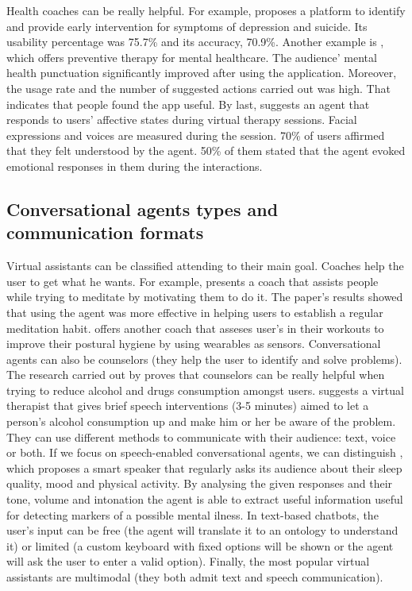 \documentclass[12pt,english]{article}
\begin{document}
Health coaches can be really helpful. For example, \cite{Breso2016297} proposes a platform to identify and provide early intervention for symptoms of depression and suicide. Its usability percentage was 75.7\% and its accuracy, 70.9\%. Another example is \cite{Hirano2017}, which offers preventive therapy for mental healthcare. The audience' mental health punctuation significantly improved after using the application. Moreover, the usage rate and the number of suggested actions carried out was high. That indicates that people found the app useful. By last, \cite{Ring2016} suggests an agent that responds to users' affective states during virtual therapy sessions. Facial expressions and voices are measured during the session. 70\% of users affirmed that they felt understood by the agent. 50\% of them stated that the agent evoked emotional responses in them during the interactions.

\newpage
\subsection{Conversational agents types and communication formats}

Virtual assistants can be classified attending to their main goal. Coaches help the user to get what he wants. For example, \cite{HUDLICKA2013160} presents a coach that assists people while trying to meditate by motivating them to do it. The paper's results showed that using the agent was more effective in helping users to establish a regular meditation habit. \cite{Guo2020} offers another coach that asseses user's in their workouts to improve their postural hygiene by using wearables as sensors. Conversational agents can also be counselors (they help the user to identify and solve problems). The research carried out by \cite{Drislane2020158} proves that counselors can be really helpful when trying to reduce alcohol and drugs consumption amongst users. \cite{Yasavur2014381} suggests a virtual therapist that gives brief speech interventions (3-5 minutes) aimed to let a person's alcohol consumption up and make him or her be aware of the problem. \\

They can use different methods to communicate with their audience: text, voice or both. If we focus on speech-enabled conversational agents, we can distinguish \cite{Maharjan2019929}, which proposes a smart speaker that regularly asks its audience about their sleep quality, mood and physical activity. By analysing the given responses and their tone, volume and  intonation the agent is able to extract useful information useful for detecting markers of a possible mental ilness. In text-based chatbots, the user's input can be free (the agent will translate it to an ontology to understand it) or limited (a custom keyboard with fixed options will be shown or the agent will ask the user to enter a valid option). Finally, the most popular virtual assistants are multimodal (they both admit text and speech communication).
\end{document}
